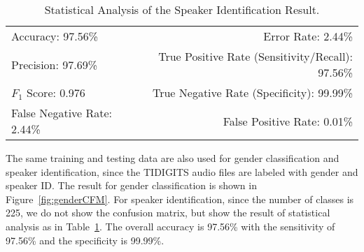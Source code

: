 \begin{table}[!h]
	\caption{Statistical Analysis of the Speaker Identification Result.}
	\label{tab:idTable}
	\centering	
	\centering
		\begin{tabular}{lr}
		\toprule
		Accuracy: 97.56\% & \hspace{-.2in} Error Rate: 2.44\% \\
		Precision: 97.69\% & \hspace{-.2in} True Positive Rate (Sensitivity/Recall): 97.56\% \\
		$F_1$ Score: 0.976 & \hspace{-.2in} True Negative Rate (Specificity): 99.99\% \\
		False Negative Rate: 2.44\%  & \hspace{-.2in} False Positive Rate: 0.01\% \\
		\bottomrule
	\end{tabular}
\end{table}


The same training and testing data are also used for gender classification and speaker identification, since the TIDIGITS audio files are labeled with gender and speaker ID. The result for gender classification is shown in Figure~\ref{fig:genderCFM}.
%
For speaker identification, since the number of classes is 225, we do not show the confusion matrix, but show the result of statistical analysis as in Table~\ref{tab:idTable}. The overall accuracy is 97.56\% with the sensitivity of 97.56\% and the specificity is 99.99\%.





